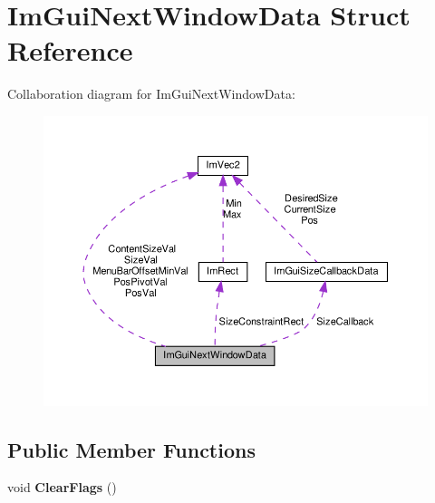 \hypertarget{structImGuiNextWindowData}{}\section{Im\+Gui\+Next\+Window\+Data Struct Reference}
\label{structImGuiNextWindowData}


Collaboration diagram for Im\+Gui\+Next\+Window\+Data\+:\nopagebreak
\begin{figure}[H]
\begin{center}
\leavevmode
\includegraphics[width=350pt]{structImGuiNextWindowData__coll__graph}
\end{center}
\end{figure}
\subsection*{Public Member Functions}
\begin{DoxyCompactItemize}
\item 
\mbox{\label{structImGuiNextWindowData_a9543431fafe3d0627fdecc5fa839487c}} 
void {\bfseries Clear\+Flags} ()
\end{DoxyCompactItemize}
